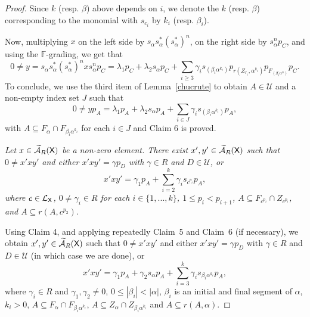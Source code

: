 \documentclass[a4paper,12pt]{amsart}
\theoremstyle{definition}
\theoremstyle{remark}
\numberwithin{equation}{section}
\newcommand{\osf}{{\normalfont \textsf{X}}}
\newcommand{\lang}{\CL_{\osf}}
\newcommand{\ualgshift}{\TCA_R(\osf)}
\newcommand{\F}{\mathbb{F}}
\newcommand{\CA}{\mathcal{A}}
\newcommand{\CL}{\mathcal{L}}
\newcommand{\TCA}{\widetilde{\CA}}
\newcommand{\TCB}{\mathcal{U}}
\begin{document}
\begin{proof}
Since $k$ (resp. $\beta$) above depends on $i$, we denote the $k$ (resp. $\beta$) corresponding to the monomial with $s_{c_i}$ by $k_i$ (resp. $\beta_i$).

Now, multiplying $x$ on the left side by $s_\alpha s_\alpha^* (s_\alpha^*)^n$, on the right side by $s_\alpha^n p_C$, and using the $\F$-grading, we get that
$$0\neq y= s_\alpha s_\alpha^* (s_\alpha^*)^n x s_\alpha^n p_C=\lambda_1 p_C+\lambda_2s_\alpha p_C+\sum\limits_{i \geq 3} \gamma_i s_{(\beta_i \alpha^{k_i})}p_{r(Z_{r_i}, \alpha^{k_i})}p_{F_{(\beta_i \alpha^n)}}p_C.$$
To conclude, we use the third item of Lemma~\ref{chucrute} to obtain $A\in \TCB$ and a non-empty index set $J$ such that 
$$0\neq y p_A=\lambda_1 p_A+\lambda_2 s_\alpha p_A+ \sum\limits_{i \in J} \gamma_i s_{(\beta_i \alpha^{k_i})}p_A,$$ with $A \subseteq F_{\alpha} \cap F_{\beta_i  \alpha^{k_i}}$ for each $i \in J$ and Claim 6 is proved. 


\smallskip
{}
{\it Let $x \in \ualgshift$ be a non-zero element. There exist $x',y'\in \ualgshift$ such that $0\neq x'xy'$ and either $x'xy'=\gamma p_D$ with $\gamma \in R$ and $D\in \TCB$, or 
$$x'xy'=\gamma_1 p_A +\sum\limits_{i=2}^k \gamma_i s_{c^{p_i}}p_A,$$
where $c\in \lang$,  $0\neq \gamma_i\in R$ for each $i\in \{1,...,k\}$, $1\leq p_i <p_{i+1}$, $A\subseteq F_{c^{p_i}}\cap Z_{c^{p_i}}$, and  $A\subseteq r(A,c^{p_2})$.}  
\smallskip

Using Claim 4, and applying repeatedly Claim~5 and Claim~6 (if necessary), we obtain $x',y'\in \ualgshift$ such that $0\neq x'xy'$ and either $x'xy'=\gamma p_D$ with $\gamma \in R$ and $D\in \TCB$ (in which case we are done), or  
$$x'xy'=\gamma_1 p_A +\gamma_2 s_\alpha p_A +\sum\limits_{i=3}^k \gamma_i s_{\beta_i \alpha^{k_i}}p_A,$$ where $\gamma_i\in R$ and $\gamma_1, \gamma_2\neq 0$, $0\leq |\beta_i|<|\alpha|$, $\beta_i$ is an initial and final segment of $\alpha$, $k_i> 0$, $A\subseteq F_{\alpha}\cap  F_{\beta_i\alpha^{k_i}}$, $A\subseteq Z_{\alpha}\cap Z_{\beta_i\alpha^{k_i}}$  and  $A\subseteq r(A,\alpha)$.


\end{proof}
\end{document}
